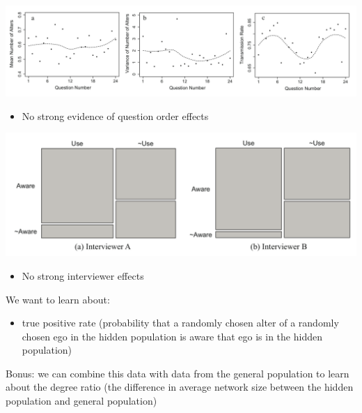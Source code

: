 \documentclass[aspectratio=169]{beamer}
\begin{document}
\begin{frame}

\begin{center}	
\includegraphics[width=\textwidth]{figures/salganik_game_2011_fig6}
\end{center}

\begin{itemize}
\item No strong evidence of question order effects
\end{itemize}

\end{frame}
\begin{frame}

\begin{center}	
\includegraphics[width=\textwidth]{figures/salganik_game_2011_fig7}
\end{center}

\begin{itemize}
\item No strong interviewer effects
\end{itemize}

\end{frame}
\begin{frame}

We want to learn about:
\begin{itemize}
\item true positive rate (probability that a randomly chosen alter of a randomly chosen ego in the hidden population is aware that ego is in the hidden population) \pause
\end{itemize}

\vfill 
Bonus: we can combine this data with data from the general population to learn about the degree ratio (the difference in average network size between the hidden population and general population)

\end{frame}
\end{document}
